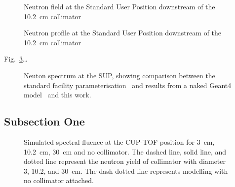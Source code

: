 \documentclass[12pt,journal]{IEEEtran}
\let\MYoriglatexcaption\caption
\renewcommand{\caption}[2][\relax]{\MYoriglatexcaption[#2]{#2}}
\begin{document}
\begin{figure}
    \todo{}
    \caption{Neutron field at the Standard User Position downstream of the \SI{10.2}{\cm} collimator}
    \label{fig:SUPCollimator}
\end{figure}

\begin{figure}
    \todo{}
    \caption{Neutron profile at the Standard User Position downstream of the \SI{10.2}{\cm} collimator}
    \label{fig:SUPProfile}
\end{figure}

Fig.~\ref{fig:FirstComparison}\ldots

\begin{figure}
	\caption{Neuton spectrum at the SUP, showing comparison between the standard facility parameterisation~\cite{Prokofiev2009} and results from a naked Geant4 model~\cite{Platt13} and this work.}
	\label{fig:FirstComparison}
\end{figure}

\subsection{Subsection One}
\begin{figure}[!t]
	\centering
	\hfil
	\caption{Simulated spectral fluence at the CUP-TOF position for \SI{3}{\cm}, \SI{10.2}{\cm}, \SI{30}{\cm} and no collimator. The dashed line, solid line, and dotted line represent the neutron yield of collimator with diameter 3, 10.2, and \SI{30}{\cm}. The dash-dotted line represents modelling with no collimator attached.}
	\label{fig_LethargylinearspaceFor4collimators}
\end{figure}
\end{document}
